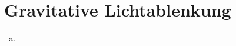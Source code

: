 \documentclass{article}
\begin{document}
    \section{Gravitative Lichtablenkung}
    \begin{enumerate}[a)]
        \item 
    \end{enumerate}
\end{document}
